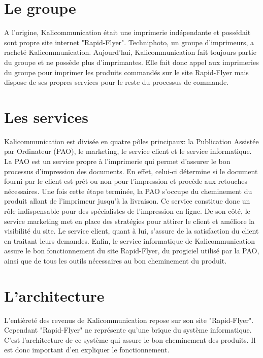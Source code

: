 
\section{Le groupe}
A l'origine, Kalicommunication était une imprimerie indépendante et possédait sont propre site internet "Rapid-Flyer".\newline
Techniphoto, un groupe d'imprimeurs, a racheté Kalicommunication. Aujourd'hui, Kalicommunication fait toujours partie du groupe et ne possède plus d'imprimantes. Elle fait donc appel aux imprimeries du groupe pour imprimer les produits commandés sur le site Rapid-Flyer mais dispose de ses propres services pour le reste du processus de commande.

\section{Les services}
Kalicommunication est divisée en quatre pôles principaux: la Publication Assistée par Ordinateur (PAO), le marketing, le service client et le service informatique.\newline
La PAO est un service propre à l'imprimerie qui permet d'assurer le bon processus d'impression des documents. En effet, celui-ci détermine si le document fourni par le client est prêt ou non pour l'impression et procède aux retouches nécessaires. Une fois cette étape terminée, la PAO s'occupe du cheminement du produit allant de l'imprimeur jusqu'à la livraison. Ce service constitue donc un rôle indispensable pour des spécialistes de l'impression en ligne.\newline
De son côté, le service marketing met en place des stratégies pour attirer le client et améliore la visibilité du site.
Le service client, quant à lui, s'assure de la satisfaction du client en traitant leurs demandes.\newline
Enfin, le service informatique de Kalicommunication assure le bon fonctionnement du site Rapid-Flyer, du progiciel utilisé par la PAO, ainsi que de tous les outils nécessaires au bon cheminement du produit.

\section{L'architecture}
L'entièreté des revenus de Kalicommunication repose sur son site "Rapid-Flyer". Cependant "Rapid-Flyer" ne représente qu'une brique du système informatique. C'est l'architecture de ce système qui assure le bon cheminement des produits. Il est donc important d'en expliquer le fonctionnement.

